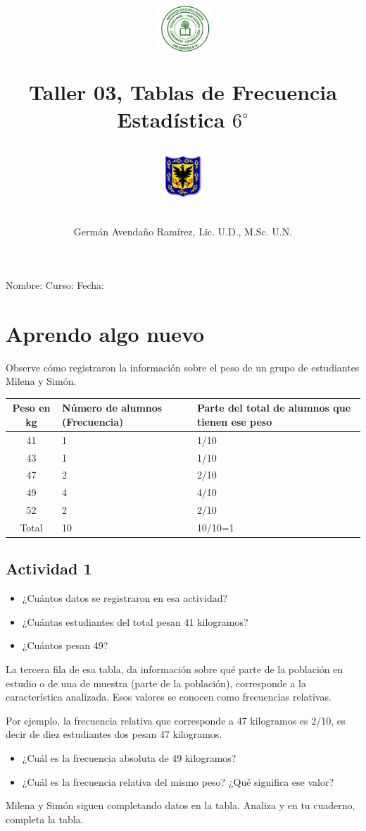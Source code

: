 \documentclass[10pt,twoside]{article}
\author{Germ\'an Avenda\~no Ram\'irez, Lic. U.D., M.Sc. U.N.}
\title{\begin{minipage}{.2\textwidth}
\includegraphics[height=1.75cm]{Images/logo-colegio.png}\end{minipage}
\begin{minipage}{.55\textwidth}
\begin{center}
Taller 03, Tablas de Frecuencia  \\
Estadística $6^{\circ}$
\end{center}
\end{minipage}\hfill
\begin{minipage}{.2\textwidth}
\includegraphics[height=1.75cm]{Images/logo-sed.png} 
\end{minipage}}
\date{}
\begin{document}
\maketitle
Nombre: \hrulefill Curso: \underline{\hspace*{44pt}} Fecha: \underline{\hspace*{2.5cm}}
\section*{Aprendo algo nuevo}
Observe cómo registraron la información sobre el peso de un grupo de estudiantes Milena y Simón.
\begin{center}
\begin{tabular}{|c|p{3.5cm}|p{6cm}|}
\hline 
Peso en kg & Número de alumnos (Frecuencia) & Parte del total de alumnos que tienen ese peso \\ 
\hline 
41 & 1 & 1/10 \\ 
\hline 
43 & 1 & 1/10 \\ 
\hline 
47 & 2 & 2/10 \\ 
\hline 
49 & 4 & 4/10 \\ 
\hline 
52 & 2 & 2/10 \\ 
\hline \hline
Total & 10 & 10/10=1 \\ \hline
\end{tabular} 
\end{center}
\subsection*{Actividad 1}
\begin{itemize}
\item ¿Cuántos datos se registraron en esa actividad?
\item ¿Cuántas estudiantes del total pesan 41 kilogramos?
\item ¿Cuántos pesan 49?
\end{itemize}
La tercera fila de esa tabla, da información sobre qué parte de la población en estudio o de una de muestra (parte de la población), corresponde a la característica analizada. Esos valores se conocen como frecuencias relativas.

Por ejemplo, la frecuencia relativa que corresponde a 47 kilogramos es 2/10, es decir de diez estudiantes dos pesan 47 kilogramos.
\begin{itemize}
\item ¿Cuál es la frecuencia absoluta de 49 kilogramos?
\item ¿Cuál es la frecuencia relativa del mismo peso? ¿Qué significa ese valor?
\end{itemize}
Milena y Simón siguen completando datos en la tabla.
Analiza y en tu cuaderno, completa la tabla.
\end{document}
